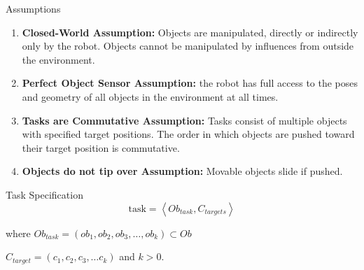\begin{frame}[fragile]{Assumptions}

  \begin{block}{}
\begin{enumerate}
  \item \textbf{Closed-World Assumption:} Objects are manipulated, directly or indirectly only by the robot. Objects cannot be manipulated by influences from outside the environment.\\
\item\textbf{Perfect Object Sensor Assumption:} the robot has full access to the poses and geometry of all objects in the environment at all times.\\
\item\textbf{Tasks are Commutative Assumption:} Tasks consist of multiple objects with specified target positions. The order in which objects are pushed toward their target position is commutative.\\
\item\textbf{Objects do not tip over Assumption:} Movable objects slide if pushed.\\
\end{enumerate}
\end{block}
\end{frame}

\begin{frame}[fragile]{Task Specification}
\[\text{task} = \left\langle Ob_{task}, C_{targets} \right\rangle\]

where $Ob_{task} = (ob_1, ob_2, ob_3, \dots, ob_k) \subset Ob$\bs

$C_{target} = (c_1, c_2, c_3, \dots c_k)$ and $k>0$.\bs
\end{frame}
